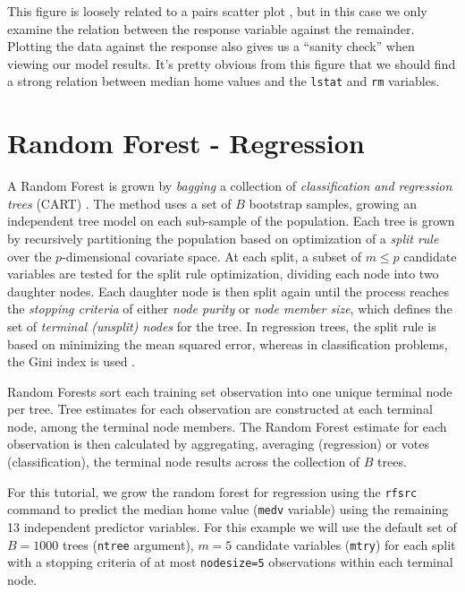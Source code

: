 \documentclass[article]{jss}
\begin{document}
This figure is loosely related to a pairs scatter plot
\citep{Becker:1988}, but in this case we only examine the relation
between the response variable against the remainder. Plotting the data
against the response also gives us a ``sanity check'' when viewing our
model results. It's pretty obvious from this figure that we should find
a strong relation between median home values and the \texttt{lstat} and
\texttt{rm} variables.

\section{Random Forest - Regression}\label{random-forest---regression}

A Random Forest is grown by \emph{bagging} \citep{Breiman:1996} a
collection of \emph{classification and regression trees} (CART)
\citep{cart:1984}. The method uses a set of \(B\) bootstrap
\citep{bootstrap:1994} samples, growing an independent tree model on
each sub-sample of the population. Each tree is grown by recursively
partitioning the population based on optimization of a \emph{split rule}
over the \(p\)-dimensional covariate space. At each split, a subset of
\(m \le p\) candidate variables are tested for the split rule
optimization, dividing each node into two daughter nodes. Each daughter
node is then split again until the process reaches the \emph{stopping
criteria} of either \emph{node purity} or \emph{node member size}, which
defines the set of \emph{terminal (unsplit) nodes} for the tree. In
regression trees, the split rule is based on minimizing the mean squared
error, whereas in classification problems, the Gini index is used
\citep{Friedman:2000}.

Random Forests sort each training set observation into one unique
terminal node per tree. Tree estimates for each observation are
constructed at each terminal node, among the terminal node members. The
Random Forest estimate for each observation is then calculated by
aggregating, averaging (regression) or votes (classification), the
terminal node results across the collection of \(B\) trees.

For this tutorial, we grow the random forest for regression using the
\texttt{rfsrc} command to predict the median home value (\texttt{medv}
variable) using the remaining 13 independent predictor variables. For
this example we will use the default set of \(B=1000\) trees
(\texttt{ntree} argument), \(m=5\) candidate variables (\texttt{mtry})
for each split with a stopping criteria of at most \texttt{nodesize=5}
observations within each terminal node.
\end{document}

